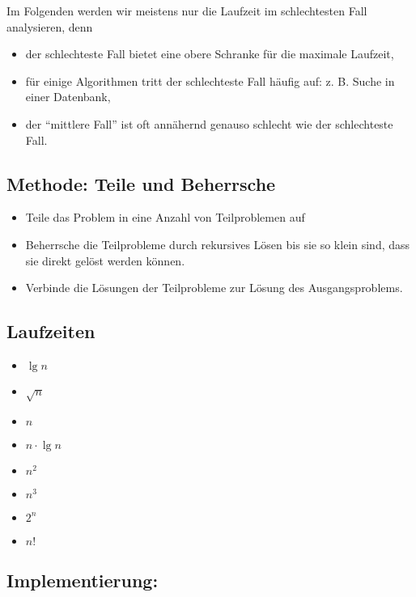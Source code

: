\documentclass[a4paper]{scrartcl}
\begin{document}
Im Folgenden werden wir meistens nur die Laufzeit im schlechtesten Fall analysieren, denn
\begin{itemize}
	\item der schlechteste Fall bietet eine obere Schranke für die maximale Laufzeit,
	\item für einige Algorithmen tritt der schlechteste Fall häufig auf: z. B. Suche in einer Datenbank,
	\item der "`mittlere Fall"' ist oft annähernd genauso schlecht wie der schlechteste Fall.
\end{itemize}

\subsection{Methode: Teile und Beherrsche}
\begin{itemize}
	\item Teile das Problem in eine Anzahl von Teilproblemen auf
	\item Beherrsche die Teilprobleme durch rekursives Lösen bis sie so klein sind, dass sie direkt gelöst werden können.
	\item Verbinde die Lösungen der Teilprobleme zur Lösung des Ausgangsproblems.
\end{itemize}

\subsection{Laufzeiten}
\begin{itemize}
	\item $\lg n$
	\item $\sqrt{n}$
	\item $n$
	\item $n\cdot\lg n$
	\item $n^2$
	\item $n^3$
	\item $2^n$
	\item $n!$
\end{itemize}


\subsection{Implementierung: }
\end{document}
